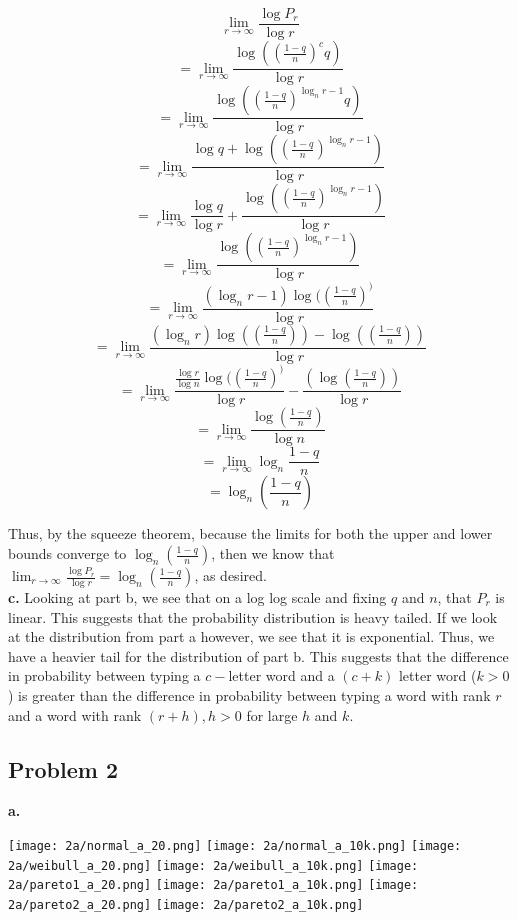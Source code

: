 \documentclass[12 pt]{article}
\begin{document}
	\[\lim_{r \rightarrow \infty} \frac {\log P_r}{\log r}\]
	\[ = \lim_{r \rightarrow \infty} \frac {\log ((\frac{1-q}{n})^c q)}{\log r}\]
	\[ = \lim_{r \rightarrow \infty} \frac {\log ((\frac{1-q}{n})^{\log_n r - 1} q)}{\log r}\]
	\[ = \lim_{r \rightarrow \infty} \frac {\log q + \log ((\frac{1-q}{n})^{\log_n r -1 })}{\log r}\]
	\[ = \lim_{r \rightarrow \infty} \frac{\log q}{\log r} + \frac {\log ((\frac{1-q}{n})^{\log_n r - 1})}{\log r}\]
	\[ = \lim_{r \rightarrow \infty} \frac {\log ((\frac{1-q}{n})^{\log_n r - 1})}{\log r}\]
	\[ = \lim_{r \rightarrow \infty} \frac {(\log_n r - 1)\log ((\frac{1-q}{n})^)}{\log r}\]
	\[ = \lim_{r \rightarrow \infty} \frac {(\log_n r)\log ((\frac{1-q}{n})) - \log ((\frac{1-q}{n})) }{\log r}\]
	\[ = \lim_{r \rightarrow \infty} \frac {\frac{\log r}{\log n} \log ((\frac{1-q}{n})^)}{\log r} - \frac{(\log(\frac{1-q}{n}))}{\log r}\]
	\[ = \lim_{r \rightarrow \infty} \frac{\log (\frac{1-q}{n})} {\log n} \]
	\[ = \lim_{r \rightarrow \infty} \log_n {\frac{1-q}{n}} \]
	\[ = \log_n ({\frac{1-q}{n}}) \]
	
	\noindent Thus, by the squeeze theorem, because the limits for both the upper and lower bounds converge to $\log_n ({\frac{1-q}{n}})$, then we know that $\lim_{r \rightarrow \infty} \frac {\log P_r}{\log r} = \log_n ({\frac{1-q}{n}})$, as desired.\\
	
	\noindent \textbf {c.} Looking at part b, we see that on a log log scale and fixing $q$ and $n$, that $P_r$ is linear. This suggests that the probability distribution is heavy tailed. If we look at the distribution from part a however, we see that it is exponential. Thus, we have a heavier tail for the distribution of part b. This suggests that the difference in probability between typing a $c - $letter word and a $(c + k)$ letter word ($k > 0$) is greater than the difference in probability between typing a word with rank $r$ and a word with rank $(r + h), h > 0$ for large $h$ and $k$. \\
	
	\subsection*{Problem 2}
	\noindent \textbf {a.}
	
	\begin{center}
		\texttt{[image: 2a/normal\_a\_20.png]}
		\texttt{[image: 2a/normal\_a\_10k.png]}
		\texttt{[image: 2a/weibull\_a\_20.png]}
		\texttt{[image: 2a/weibull\_a\_10k.png]}
		\texttt{[image: 2a/pareto1\_a\_20.png]}
		\texttt{[image: 2a/pareto1\_a\_10k.png]}
		\texttt{[image: 2a/pareto2\_a\_20.png]}
		\texttt{[image: 2a/pareto2\_a\_10k.png]}
	\end{center}
\end{document}
